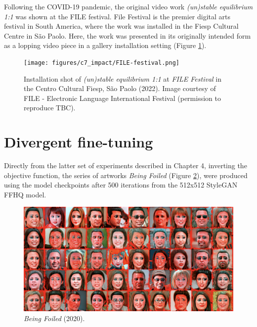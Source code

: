 Following the COVID-19 pandemic, the original video work \textit{(un)stable equilibrium 1:1} was shown at the FILE festival. 
File Festival is the premier digital arts festival in South America, where the work was installed in the Fiesp Cultural Centre in São Paolo. 
Here, the work was presented in its originally intended form as a lopping video piece in a gallery installation setting (Figure \ref{fig:c7:file-festival}).

\begin{figure}[!htb]
    \centering
    \captionsetup{justification=centering}
    \texttt{[image: figures/c7\_impact/FILE-festival.png]}
    \caption[Installation shot of \textit{(un)stable equilibrium} at FILE festival]{Installation shot of \textit{(un)stable equilibrium 1:1} at \textit{FILE Festival} in the Centro Cultural Fiesp, São Paolo (2022). Image courtesy of FILE - Electronic Language International Festival (permission to reproduce TBC).}
    \label{fig:c7:file-festival}
\end{figure}

\section{Divergent fine-tuning}
\label{c7:sec:divergent}


Directly from the latter set of experiments described in Chapter 4, inverting the objective function, the series of artworks \textit{Being Foiled} (Figure \ref{fig:c7:being-foiled}), were produced using the model checkpoints after 500 iterations from the 512x512 StyleGAN FFHQ model. 

\begin{figure}[!htb]
    \centering
    \captionsetup{justification=centering}
    \includegraphics[width=1\textwidth]{figures/c7_impact/being-foiled.png}
    \caption{\textit{Being Foiled} (2020).}
    \label{fig:c7:being-foiled}
\end{figure}

